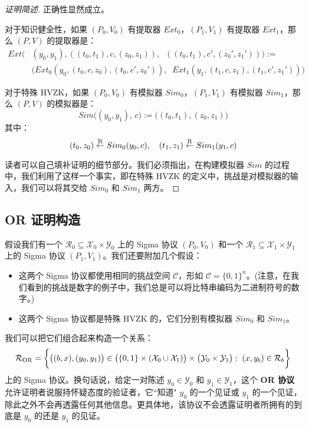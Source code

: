 \begin{proof}[证明简述]
正确性显然成立。

对于知识健全性，如果 $(P_0,V_0)$ 有提取器 $Ext_0$，$(P_1,V_1)$ 有提取器 $Ext_1$，那么 $(P, V)$ 的提取器是：
\begin{equation*}
\begin{aligned}
Ext
\Big( & (y_0,y_1),((t_0,t_1),c,(z_0,z_1)),\;\;((t_0,t_1),c',(z_0',z_1'))
\Big):=\\
& \Big(Ext_0(y_0,(t_0,c,z_0),(t_0,c',z_0')),\;\;Ext_1(y_1,(t_1,c,z_1),(t_1,c',z_1'))\Big)
\end{aligned}
\end{equation*}

对于特殊 HVZK，如果 $(P_0,V_0)$ 有模拟器 $Sim_0$，$(P_1,V_1)$ 有模拟器 $Sim_1$，那么 $(P, V)$ 的模拟器是：
\[
Sim\big((y_0,y_1),\,c\big):=\big((t_0,t_1),(z_0,z_1)\big)
\]
其中：
\[
(t_0,z_0)\overset{\rm R}\leftarrow Sim_0(y_0,c),
\quad
(t_1,z_1)\overset{\rm R}\leftarrow Sim_1(y_1,c)
\]

读者可以自己填补证明的细节部分。我们必须指出，在构建模拟器 $Sim$ 的过程中，我们利用了这样一个事实，即在特殊 HVZK 的定义中，挑战是对模拟器的输入，我们可以将其交给 $Sim_0$ 和 $Sim_1$ 两方。
\end{proof}

\subsection{OR 证明构造}\label{subsec:19-7-2}

假设我们有一个 $\mathcal{R}_0\subseteq\mathcal{X}_0\times\mathcal{Y}_0$ 上的 Sigma 协议 $(P_0,V_0)$ 和一个 $\mathcal{R}_1\subseteq\mathcal{X}_1\times\mathcal{Y}_1$ 上的 Sigma 协议 $(P_1,V_1)$。我们还要附加几个假设：
\begin{itemize}
	\item 这两个 Sigma 协议都使用相同的挑战空间 $\mathcal{C}$，形如 $\mathcal{C}=\{0,1\}^n$。(注意，在我们看到的挑战是数字的例子中，我们总是可以将比特串编码为二进制符号的数字。)
	\item 这两个 Sigma 协议都是特殊 HVZK 的，它们分别有模拟器 $Sim_0$ 和 $Sim_1$。
\end{itemize}
我们可以把它们组合起来构造一个关系：
\begin{equation}\label{eq:19-23}
\mathcal{R}_{\rm OR}=
\bigg\lbrace
\big((b,x), (y_0,y_1)\big)\in\big(\{0,1\}\times(\mathcal{X}_0\cup\mathcal{X}_1)\big)\times\big(\mathcal{Y}_0\times\mathcal{Y}_1\big):\;(x,y_b)\in\mathcal{R}_b
\bigg\rbrace
\end{equation}
上的 Sigma 协议。换句话说，给定一对陈述 $y_0\in\mathcal{Y}_0$ 和 $y_1\in\mathcal{Y}_1$，这个 \textbf{OR 协议}允许证明者说服持怀疑态度的验证者，它``知道" $y_0$ 的一个见证或 $y_1$ 的一个见证，除此之外不会再透露任何其他信息。更具体地，该协议不会透露证明者所拥有的到底是 $y_0$ 的还是 $y_1$ 的见证。

